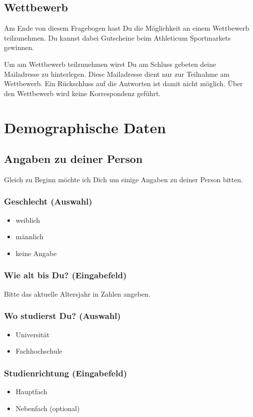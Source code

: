 \begin{RaggedRight}
\subsection*{Wettbewerb}
Am Ende von diesem Fragebogen hast Du die Möglichkeit an einem Wettbewerb teilzunehmen. Du kannst dabei Gutscheine beim Athleticum Sportmarkets gewinnen. \par
Um am Wettbewerb teilzunehmen wirst Du am Schluss gebeten deine Mailadresse zu hinterlegen. Diese Mailadresse dient nur zur Teilnahme am Wettbewerb. Ein Rückschluss auf die Antworten ist damit nicht möglich. Über den Wettbewerb wird keine Korrespondenz geführt.
\section{Demographische Daten}\label{anhangSesction.demograpData}
\subsection*{Angaben zu deiner Person}
Gleich zu Beginn möchte ich Dich um einige Angaben zu deiner Person bitten.
\subsubsection*{Geschlecht (Auswahl)}
    \begin{itemize}
      \item weiblich
      \item männlich
      \item keine Angabe
    \end{itemize}
\end{RaggedRight}
\subsubsection*{Wie alt bis Du? (Eingabefeld)}
Bitte das aktuelle Altersjahr in Zahlen angeben.
\subsubsection*{Wo studierst Du? (Auswahl)}
    \begin{itemize}
      \item Universität
      \item Fachhochschule
    \end{itemize}
\subsubsection*{Studienrichtung (Eingabefeld)}
    \begin{itemize}
      \item Hauptfach
      \item Nebenfach (optional)
    \end{itemize}
